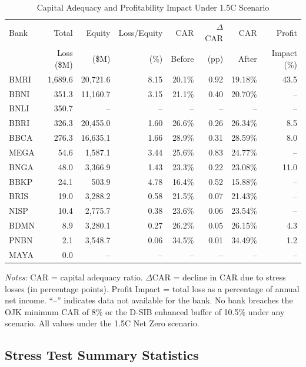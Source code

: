 \begin{table}[htbp]
\centering
\caption{Capital Adequacy and Profitability Impact Under 1.5\textdegree C Scenario}
\label{tab:full_car_results}
\footnotesize
\begin{tabular}{lrrrrrrr}
\toprule
Bank & Total & Equity & Loss/Equity & CAR & $\Delta$CAR & CAR & Profit \\
 & Loss (\$M) & (\$M) & (\%) & Before & (pp) & After & Impact (\%) \\
\midrule
BMRI & 1,689.6 & 20,721.6 & 8.15 & 20.1\% & 0.92 & 19.18\% & 43.5 \\
BBNI & 351.3 & 11,160.7 & 3.15 & 21.1\% & 0.40 & 20.70\% & -- \\
BNLI & 350.7 & -- & -- & -- & -- & -- & -- \\
BBRI & 326.3 & 20,455.0 & 1.60 & 26.6\% & 0.26 & 26.34\% & 8.5 \\
BBCA & 276.3 & 16,635.1 & 1.66 & 28.9\% & 0.31 & 28.59\% & 8.0 \\
MEGA & 54.6 & 1,587.1 & 3.44 & 25.6\% & 0.83 & 24.77\% & -- \\
BNGA & 48.0 & 3,366.9 & 1.43 & 23.3\% & 0.22 & 23.08\% & 11.0 \\
BBKP & 24.1 & 503.9 & 4.78 & 16.4\% & 0.52 & 15.88\% & -- \\
BRIS & 19.0 & 3,288.2 & 0.58 & 21.5\% & 0.07 & 21.43\% & -- \\
NISP & 10.4 & 2,775.7 & 0.38 & 23.6\% & 0.06 & 23.54\% & -- \\
BDMN & 8.9 & 3,280.1 & 0.27 & 26.2\% & 0.05 & 26.15\% & 4.3 \\
PNBN & 2.1 & 3,548.7 & 0.06 & 34.5\% & 0.01 & 34.49\% & 1.2 \\
MAYA & 0.0 & -- & -- & -- & -- & -- & -- \\
\bottomrule
\end{tabular}

\smallskip
\noindent \textit{Notes:} CAR = capital adequacy ratio. $\Delta$CAR = decline in CAR due to stress losses (in percentage points). Profit Impact = total loss as a percentage of annual net income. ``--'' indicates data not available for the bank. No bank breaches the OJK minimum CAR of 8\% or the D-SIB enhanced buffer of 10.5\% under any scenario. All values under the 1.5\textdegree C Net Zero scenario.
\end{table}


\subsection{Stress Test Summary Statistics}
\label{subsec:stress_summary}

